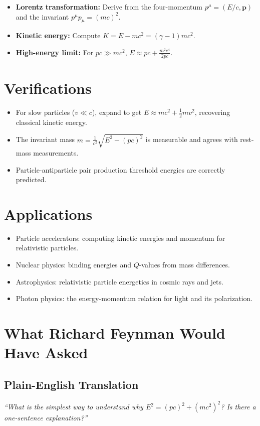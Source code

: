 \begin{itemize}
    \item \textbf{Lorentz transformation:} Derive from the four-momentum $p^\mu = (E/c, \mathbf{p})$ and the invariant $p^\mu p_\mu = (mc)^2$.
    \item \textbf{Kinetic energy:} Compute $K = E - mc^2 = (\gamma - 1)mc^2$.
    \item \textbf{High-energy limit:} For $pc \gg mc^2$, $E \approx pc + \frac{m^2c^4}{2pc}$.
\end{itemize}
\section*{Verifications}

\begin{itemize}
    \item For slow particles ($v \ll c$), expand to get $E \approx mc^2 + \frac{1}{2}mv^2$, recovering classical kinetic energy.
    \item The invariant mass $m = \frac{1}{c^2}\sqrt{E^2 - (pc)^2}$ is measurable and agrees with rest-mass measurements.
    \item Particle-antiparticle pair production threshold energies are correctly predicted.
\end{itemize}
\section*{Applications}

\begin{itemize}
    \item Particle accelerators: computing kinetic energies and momentum for relativistic particles.
    \item Nuclear physics: binding energies and $Q$-values from mass differences.
    \item Astrophysics: relativistic particle energetics in cosmic rays and jets.
    \item Photon physics: the energy-momentum relation for light and its polarization.
\end{itemize}
\section*{What Richard Feynman Would Have Asked}

\subsection*{Plain-English Translation}
\textit{``What is the simplest way to understand why $E^2 = (pc)^2 + (mc^2)^2$? Is there a one-sentence explanation?''}


